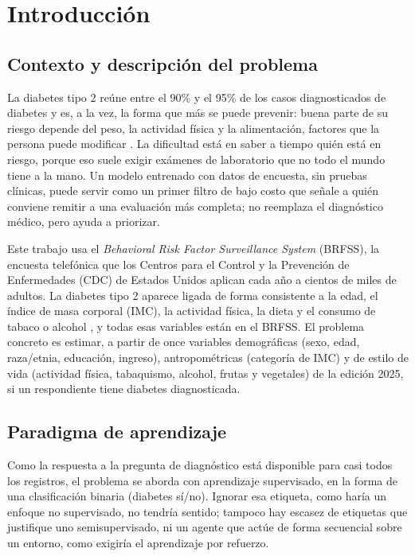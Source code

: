 \section{Introducción}

\subsection{Contexto y descripción del problema}
La diabetes tipo 2 reúne entre el 90\% y el 95\% de los casos diagnosticados de diabetes y es, a la vez, la forma que más se puede prevenir: buena parte de su riesgo depende del peso, la actividad física y la alimentación, factores que la persona puede modificar \cite{xie2019}. La dificultad está en saber a tiempo quién está en riesgo, porque eso suele exigir exámenes de laboratorio que no todo el mundo tiene a la mano. Un modelo entrenado con datos de encuesta, sin pruebas clínicas, puede servir como un primer filtro de bajo costo que señale a quién conviene remitir a una evaluación más completa; no reemplaza el diagnóstico médico, pero ayuda a priorizar.

Este trabajo usa el \textit{Behavioral Risk Factor Surveillance System} (BRFSS), la encuesta telefónica que los Centros para el Control y la Prevención de Enfermedades (CDC) de Estados Unidos aplican cada año a cientos de miles de adultos. La diabetes tipo 2 aparece ligada de forma consistente a la edad, el índice de masa corporal (IMC), la actividad física, la dieta y el consumo de tabaco o alcohol \cite{majcherek2025}, y todas esas variables están en el BRFSS. El problema concreto es estimar, a partir de once variables demográficas (sexo, edad, raza/etnia, educación, ingreso), antropométricas (categoría de IMC) y de estilo de vida (actividad física, tabaquismo, alcohol, frutas y vegetales) de la edición 2025, si un respondiente tiene diabetes diagnosticada.

\subsection{Paradigma de aprendizaje}
Como la respuesta a la pregunta de diagnóstico está disponible para casi todos los registros, el problema se aborda con aprendizaje supervisado, en la forma de una clasificación binaria (diabetes sí/no). Ignorar esa etiqueta, como haría un enfoque no supervisado, no tendría sentido; tampoco hay escasez de etiquetas que justifique uno semisupervisado, ni un agente que actúe de forma secuencial sobre un entorno, como exigiría el aprendizaje por refuerzo.

